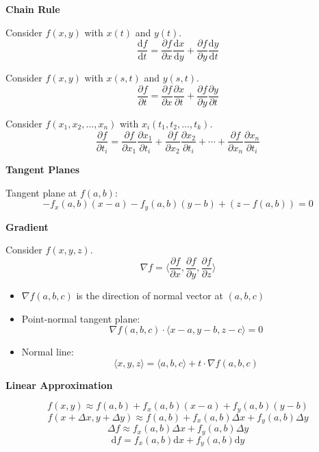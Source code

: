 \documentclass[10pt]{article}
\newcommand{\dv}[2]{\frac{\mathrm{d} #1}{\mathrm{d} #2}}
\newcommand{\pd}[2]{\frac{\partial #1}{\partial #2}}
\newcommand\sectionheading[1]{\begin{center}\large{\textbf{#1}}\end{center}\normalsize}
\newcommand\heading[1]{\smallskip\textbf{#1}\smallskip}
\begin{document}
\begin{multicols*}{3}
\heading{Chain Rule}

Consider $f(x,y)$ with $x(t)$ and $y(t)$.
\[\dv ft=\pd fx\dv xy+\pd fy\dv yt\]

Consider $f(x,y)$ with $x(s,t)$ and $y(s,t)$.
\[\pd ft=\pd fx\pd xt+\pd fy\pd yt\]

Consider $f(x_1,x_2,\ldots,x_n)$ with $x_i(t_1,t_2,\ldots,t_k)$.
\[\pd f{t_i}=\pd{f}{x_1}\pd{x_1}{t_i}+\pd{f}{x_2}\pd{x_2}{t_i}+\cdots+\pd{f}{x_n}\pd{x_n}{t_i}\]

\sectionheading{Tangent Planes}

Tangent plane at $f(a,b)$:
\[-f_x(a,b)(x-a)-f_y(a,b)(y-b)+(z-f(a,b))=0\]

\sectionheading{Gradient}

Consider $f(x,y,z)$. 
\[\nabla f=\bigg\langle \pd fx,\pd fy,\pd fz\bigg\rangle\]

\begin{itemize}[noitemsep,topsep=0pt]
    \item $\nabla f(a,b,c)$ is the direction of normal vector at $(a,b,c)$ 
    \item Point-normal tangent plane:
    \[\nabla f(a,b,c)\cdot\langle x-a,y-b,z-c\rangle=0\]
    \item Normal line:
    \[\langle x,y,z\rangle=\langle a,b,c\rangle+t\cdot\nabla f(a,b,c)\]
\end{itemize}

\sectionheading{Linear Approximation}
\[f(x,y)\approx f(a,b)+f_x(a,b)(x-a)+f_y(a,b)(y-b)\]
\[f(x+\Delta x,y+\Delta y)\approx f(a,b)+f_x(a,b)\Delta x+f_y(a,b)\Delta y\]
\[\Delta f\approx f_x(a,b)\Delta x+f_y(a,b)\Delta y\]
\[\mathrm{d}f=f_x(a,b)\mathrm{d}x+f_y(a,b)\mathrm{d}y\]

\end{multicols*}
\end{document}
